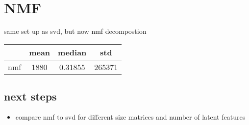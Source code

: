\documentclass[]{article}
\begin{document}
\section{NMF}
same set up as svd, but now nmf decompostion

\begin{tabular}{l |c | c| c|}
    & mean & median & std\\
    \hline
    nmf & 1880 & 0.31855 & 265371\\
\end{tabular}

\subsection{next steps}
\begin{itemize}
    \item compare nmf to svd for different size matrices and number of latent features
\end{itemize}
\end{document}
